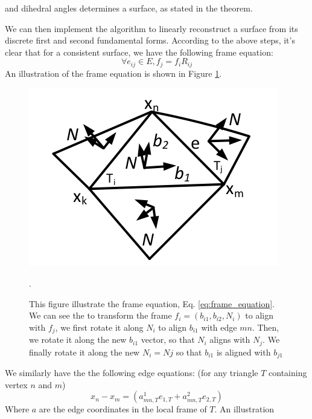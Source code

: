\documentclass{6838publ}
\begin{document}
and dihedral angles determines a surface, as stated in the theorem.
\par We can then implement the algorithm to linearly reconstruct a
surface from its discrete first and second fundamental
forms. According to the above steps, it's clear that for a consistent
surface, we have the following frame equation:
\begin{equation}\label{eq:frame_equation} \forall e_{ij} \in E, f_{j}
= f_{i} R_{ij}
\end{equation} An illustration of the frame equation is shown in
Figure \ref{fig:frame_equation}.
\begin{figure}[t!]  \centering
  \includegraphics[width=.6\linewidth]{frame_equation}
  \caption{ This figure illustrate the frame equation,
Eq. \ref{eq:frame_equation}.  We can see the to transform the frame
$f_{i} = (b_{i1}, b_{i2}, N_{i})$ to align with $f_{j}$, we first
rotate it along $N_{i}$ to align $b_{i1}$ with edge $mn$. Then, we
rotate it along the new $b_{i1}$ vector, so that $N_{i}$ aligns with
$N_{j}$.  We finally rotate it along the new $N_{i} = N{j}$ so that
$b_{i1}$ is aligned with $b_{j1}$}.
  \label{fig:frame_equation}
\end{figure} We similarly have the the following edge equations: (for
any triangle $T$ containing vertex $n$ and $m$)
\begin{equation}\label{eq:edge_equation} x_{n} - x_{m} = (a^{1}_{mn,
T} e_{1,T} + a^{2}_{mn, T} e_{2,T})
\end{equation} Where $a$ are the edge coordinates in the local frame
of $T$. An illustration
\end{document}
